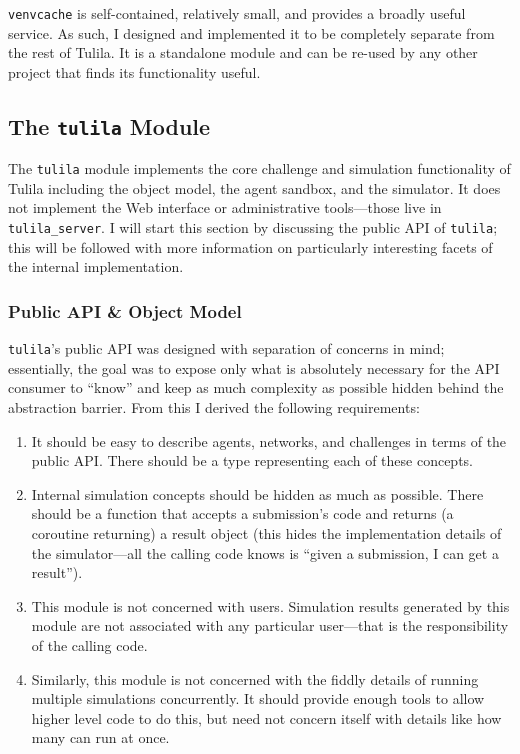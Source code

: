 \documentclass[12pt]{article}
\begin{document}
\texttt{venvcache} is self-contained, relatively small, and provides a broadly useful service. As such, I designed and implemented it to be completely separate from the rest of Tulila. It is a standalone module and can be re-used by any other project that finds its functionality useful.


\subsection{\texorpdfstring{The \texttt{tulila} Module}{The tulila Module}}

The \texttt{tulila} module implements the core challenge and simulation functionality of Tulila including the object model, the agent sandbox, and the simulator. It does not implement the Web interface or administrative tools---those live in \texttt{tulila\_server}. I will start this section by discussing the public API of \texttt{tulila}; this will be followed with more information on particularly interesting facets of the internal implementation.

\subsubsection{Public API \& Object Model}

\texttt{tulila}'s public API was designed with separation of concerns in mind; essentially, the goal was to expose only what is absolutely necessary for the API consumer to ``know'' and keep as much complexity as possible hidden behind the abstraction barrier. From this I derived the following requirements:

\begin{enumerate}
  \item It should be easy to describe agents, networks, and challenges in terms of the public API. There should be a type representing each of these concepts.
  \item Internal simulation concepts should be hidden as much as possible. There should be a function that accepts a submission's code and returns (a coroutine returning) a result object (this hides the implementation details of the simulator---all the calling code knows is ``given a submission, I can get a result'').
  \item This module is not concerned with users. Simulation results generated by this module are not associated with any particular user---that is the responsibility of the calling code.
  \item Similarly, this module is not concerned with the fiddly details of running multiple simulations concurrently. It should provide enough tools to allow higher level code to do this, but need not concern itself with details like how many can run at once.
\end{enumerate}
\end{document}
